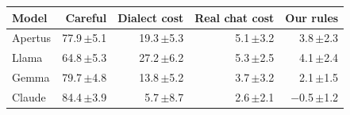 \begin{tabular}{lrrrr}
\toprule
Model & Careful & Dialect cost & Real chat cost & Our rules \\
\midrule
Apertus & 77.9\,{\scriptsize$\pm$5.1} & 19.3\,{\scriptsize$\pm$5.3} & 5.1\,{\scriptsize$\pm$3.2} & 3.8\,{\scriptsize$\pm$2.3} \\
Llama & 64.8\,{\scriptsize$\pm$5.3} & 27.2\,{\scriptsize$\pm$6.2} & 5.3\,{\scriptsize$\pm$2.5} & 4.1\,{\scriptsize$\pm$2.4} \\
Gemma & 79.7\,{\scriptsize$\pm$4.8} & 13.8\,{\scriptsize$\pm$5.2} & 3.7\,{\scriptsize$\pm$3.2} & 2.1\,{\scriptsize$\pm$1.5} \\
Claude & 84.4\,{\scriptsize$\pm$3.9} & 5.7\,{\scriptsize$\pm$8.7} & 2.6\,{\scriptsize$\pm$2.1} & $-$0.5\,{\scriptsize$\pm$1.2} \\
\bottomrule
\end{tabular}

